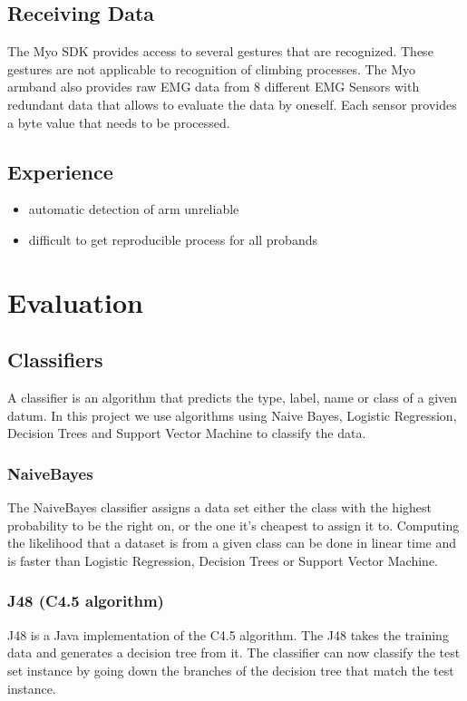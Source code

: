 \documentclass[journal]{IEEEtran}
\begin{document}
\subsection{Receiving Data}
The Myo SDK \autocite{myosdk} provides access to several gestures that are recognized. These gestures are not applicable to recognition of climbing processes. The Myo armband also provides raw EMG data from 8 different EMG Sensors with redundant data that allows to evaluate the data by oneself. Each sensor provides a byte value that needs to be processed.
\subsection{Experience}
\begin{itemize}
 \item automatic detection of arm unreliable
 \item difficult to get reproducible process for all probands
\end{itemize}

\section{Evaluation}

\subsection{Classifiers}
A classifier is an algorithm that predicts the type, label, name or class of a given datum. In this project we use algorithms using Naive Bayes, Logistic Regression, Decision Trees and Support Vector Machine to classify the data.\autocite{machine_learning}
\subsubsection{NaiveBayes}
The NaiveBayes classifier assigns a data set either the class with the highest probability to be the right on, or the one it\rq{}s cheapest to assign it to. Computing the likelihood that a dataset is from a given class can be done in linear time and is faster than Logistic Regression, Decision Trees or Support Vector Machine. \autocite{ibm}
\subsubsection{J48 (C4.5 algorithm)}
J48 is a Java implementation of the C4.5 algorithm. The J48 takes the training data and generates a decision tree from it. The classifier can now classify the test set instance by going down the branches of the decision tree that match the test instance. \autocite{top10}
\end{document}
